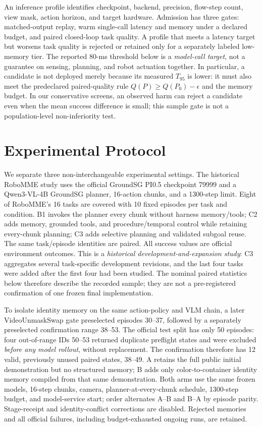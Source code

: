 \documentclass[letterpaper,10pt,conference]{ieeeconf}
\begin{document}
An inference profile identifies checkpoint, backend, precision, flow-step count, view mask, action horizon, and target hardware. Admission has three gates: matched-output replay, warm single-call latency and memory under a declared budget, and paired closed-loop task quality. A profile that meets a latency target but worsens task quality is rejected or retained only for a separately labeled low-memory tier. The reported 80-ms threshold below is a \emph{model-call target}, not a guarantee on sensing, planning, and robot actuation together.
In particular, a candidate is not deployed merely because its measured
$T_{95}$ is lower: it must also meet the predeclared paired-quality rule
$Q(P)\geq Q(P_0)-\epsilon$ and the memory budget. In our conservative
screens, an observed harm can reject a candidate even when the mean
success difference is small; this sample gate is not a population-level
non-inferiority test.

\section{Experimental Protocol}
\label{sec:protocol}
We separate three non-interchangeable experimental settings. The historical RoboMME study uses the official GroundSG PI0.5 checkpoint 79999 and a Qwen3-VL-4B GroundSG planner, 16-action chunks, and a 1300-step limit. Eight of RoboMME's 16 tasks are covered with 10 fixed episodes per task and condition. B1 invokes the planner every chunk without harness memory/tools; C2 adds memory, grounded tools, and procedure/temporal control while retaining every-chunk planning; C3 adds selective planning and validated subgoal reuse. The same task/episode identities are paired. All success values are official environment outcomes. This is a \emph{historical development-and-expansion study}: C3 aggregates several task-specific development revisions, and the last four tasks were added after the first four had been studied. The nominal paired statistics below therefore describe the recorded sample; they are not a pre-registered confirmation of one frozen final implementation.

To isolate identity memory on the same action-policy and VLM chain, a later
VideoUnmaskSwap gate preselected episodes 30--37, followed by a separately
preselected confirmation range 38--53. The official test split has only 50
episodes: four out-of-range IDs 50--53 returned duplicate preflight states
and were excluded \emph{before any model rollout}, without replacement.
The confirmation therefore has 12 valid, previously unused paired states, 38--49.
A retains the full public initial demonstration but no structured memory;
B adds only color-to-container identity memory compiled from that same
demonstration. Both arms use the same frozen models, 16-step chunks, camera,
planner-at-every-chunk schedule, 1300-step budget, and model-service start;
order alternates A--B and B--A by episode parity. Stage-receipt and
identity-conflict corrections are disabled. Rejected memories and all official
failures, including budget-exhausted ongoing runs, are retained.
\end{document}
